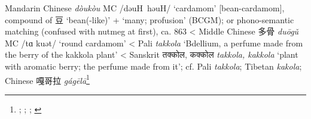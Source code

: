 \begin{etymology}\label{ety:doukou}
Mandarin Chinese {} \textit{dòukòu} \gls{MC} /dəuH həuH/ `cardamom' [bean-cardamom], compound of 豆 `bean(-like)' +  `many; profusion' (BCGM); or phono-semantic matching (confused with nutmeg at first), ca. 863
< Middle Chinese {多骨} \textit{duōgǔ} \gls{MC} /tɑ kuət/ `round cardamom'
< Pali \textit{takkola} `Bdellium, a perfume made from the berry of the kakkola plant'
< Sanskrit {तक्कोल, कक्कोल} \textit{takkola, kakkola} `plant with aromatic berry; the perfume made from it'; cf. Pali \textit{takkola}; Tibetan  \textit{kakola}; Chinese 嘎哥拉 \textit{gágēlā}\footnote{\textcite[22]{donkin_between_2003}; \textcite[18:55]{yyzz}; \textcite[292]{pali_text_society_pali_1921}; \textcite[431, 241]{monier-williams_sanskrit-english_1899}}
\end{etymology}